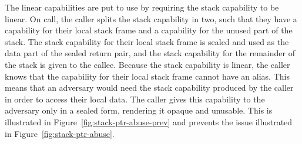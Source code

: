 \documentclass[acmsmall,review,showframe]{acmart}\settopmatter{printfolios=true,printccs=false,printacmref=false}
\begin{document}
The linear capabilities are put to use by requiring the stack capability to be linear.
On call, the caller splits the stack capability in two, such that they have a capability for their local stack frame and a capability for the unused part of the stack.
The stack capability for their local stack frame is sealed and used as the data part of the sealed return pair, and the stack capability for the remainder of the stack is given to the callee.
Because the stack capability is linear, the caller knows that the capability for their local stack frame cannot have an alias.
This means that an adversary would need the stack capability produced by the caller in order to access their local data.
The caller gives this capability to the adversary only in a sealed form, rendering it opaque and unusable.
This is illustrated in Figure~\ref{fig:stack-ptr-abuse-prev} and prevents the issue illustrated in Figure~\ref{fig:stack-ptr-abuse}.
\end{document}

